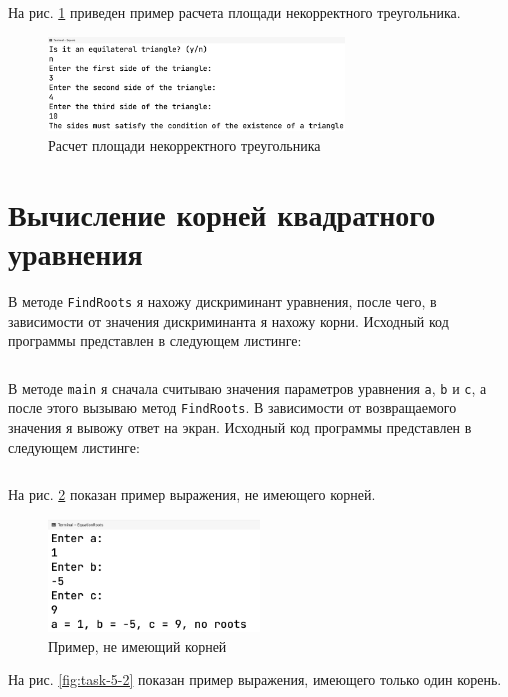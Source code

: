 \documentclass[a4paper,14pt]{extarticle}
\numberwithin{figure}{section}
\begin{document}
На рис. \ref{fig:task-4-3} приведен пример расчета площади некорректного треугольника.

\begin{figure}[H]
    \centering
    \includegraphics[width=0.7\textwidth]{images/task-4-3.png}
    \caption{Расчет площади некорректного треугольника}
    \label{fig:task-4-3}
\end{figure}

\section{Вычисление корней квадратного уравнения}

В методе \texttt{FindRoots} я нахожу дискриминант уравнения, после чего, в зависимости от значения дискриминанта я нахожу корни. Исходный код программы представлен в следующем листинге:
\inputminted{csharp}{../EquationRoots/EquationRoots/Equation.cs}

В методе \texttt{main} я сначала считываю значения параметров уравнения \texttt{a}, \texttt{b} и \texttt{c}, а после этого вызываю метод \texttt{FindRoots}. В зависимости от возвращаемого значения я вывожу ответ на экран. Исходный код программы представлен в следующем листинге:
\inputminted{csharp}{../EquationRoots/EquationRoots/Program.cs}

На рис. \ref{fig:task-5-1} показан пример выражения, не имеющего корней.

\begin{figure}[H]
    \centering
    \includegraphics[width=0.5\textwidth]{images/task-5-1.png}
    \caption{Пример, не имеющий корней}
    \label{fig:task-5-1}
\end{figure}

На рис. \ref{fig:task-5-2} показан пример выражения, имеющего только один корень.
\end{document}
